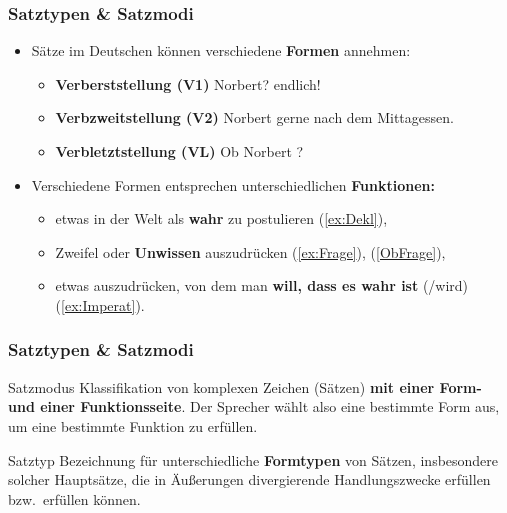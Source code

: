 \begin{frame}
\frametitle{Satztypen \& Satzmodi}

\begin{itemize}
	\item Sätze im Deutschen können verschiedene \textbf{Formen} annehmen:
	\begin{itemize}
		\item \textbf{Verberststellung (V1)}
		\eal 
		\ex \label{ex:Frage}  Norbert?
		\ex \label{ex:Imperat}  endlich!
		\zl
		
		\item \textbf{Verbzweitstellung (V2)}
		\ea \label{ex:Dekl} Norbert  gerne nach dem Mittagessen.
		\z
		
		\item \textbf{Verbletztstellung (VL)}
		\ea \label{ObFrage} Ob Norbert ?
		\z
		
	\end{itemize}	

\pause

	\item Verschiedene Formen entsprechen unterschiedlichen \textbf{Funktionen:}
	\begin{itemize}
		\item etwas in der Welt als \textbf{wahr} zu postulieren (\ref{ex:Dekl}),
		\item Zweifel oder \textbf{Unwissen} auszudrücken (\ref{ex:Frage}), (\ref{ObFrage}),
		\item etwas auszudrücken, von dem man \textbf{will, dass es wahr ist} (/wird) (\ref{ex:Imperat}).		
	\end{itemize}
\end{itemize}

\end{frame}


\begin{frame}
\frametitle{Satztypen \& Satzmodi}

\begin{block}{Satzmodus}
Klassifikation von komplexen Zeichen (Sätzen) \textbf{mit einer Form- und einer Funktionsseite}. Der Sprecher wählt also eine bestimmte Form aus, um eine bestimmte Funktion zu erfüllen. \citep[vgl.][]{Altmann93a}
\end{block}


\pause 


\begin{block}{Satztyp}
Bezeichnung für unterschiedliche \textbf{Formtypen} von Sätzen, insbesondere solcher Hauptsätze, die in Äußerungen divergierende Handlungszwecke erfüllen bzw.\ erfüllen können. \citep[vgl.][]{Fries16d, Fries16e}
\end{block}


\end{frame}


